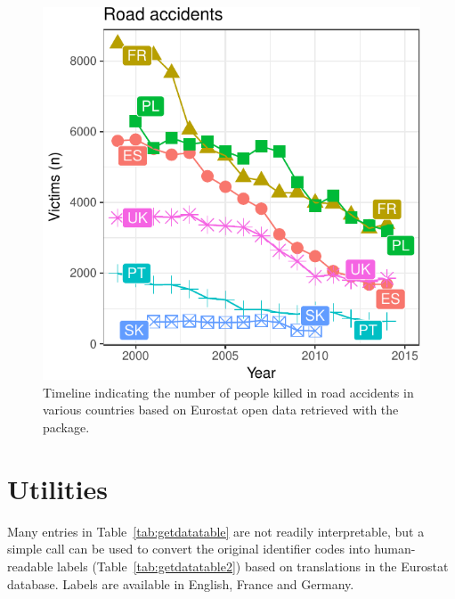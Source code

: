 \begin{figure}[h]
\begin{center}
\includegraphics{2015-manu-roadacc-1}
\end{center}
\caption{Timeline indicating the number of people killed in road accidents in various countries based on Eurostat open data retrieved with the  package.}
\label{fig:transport}
\end{figure}




\section{Utilities}

Many entries in Table~\ref{tab:getdatatable} are not readily
interpretable, but a simple call  can be
used to convert the original identifier codes into human-readable
labels (Table~\ref{tab:getdatatable2}) based on translations
in the Eurostat database. Labels are available in English, France and
Germany.

